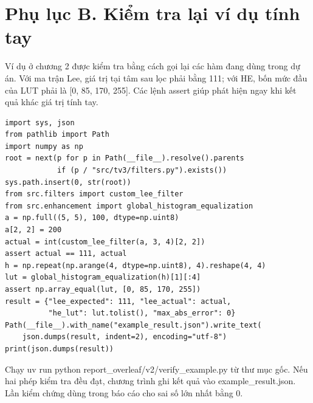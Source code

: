 \documentclass[12pt,a4paper]{extreport}
\begin{document}
\section*{Phụ lục B. Kiểm tra lại ví dụ tính tay}
Ví dụ ở chương 2 được kiểm tra bằng cách gọi lại các hàm đang dùng trong dự án. Với ma trận Lee, giá trị tại tâm sau lọc phải bằng 111; với HE, bốn mức đầu của LUT phải là [0, 85, 170, 255]. Các lệnh assert giúp phát hiện ngay khi kết quả khác giá trị tính tay.
\par
\begin{Verbatim}[fontsize=\fontsize{9}{10.3}\selectfont]
import sys, json
from pathlib import Path
import numpy as np
root = next(p for p in Path(__file__).resolve().parents
            if (p / "src/tv3/filters.py").exists())
sys.path.insert(0, str(root))
from src.filters import custom_lee_filter
from src.enhancement import global_histogram_equalization
a = np.full((5, 5), 100, dtype=np.uint8)
a[2, 2] = 200
actual = int(custom_lee_filter(a, 3, 4)[2, 2])
assert actual == 111, actual
h = np.repeat(np.arange(4, dtype=np.uint8), 4).reshape(4, 4)
lut = global_histogram_equalization(h)[1][:4]
assert np.array_equal(lut, [0, 85, 170, 255])
result = {"lee_expected": 111, "lee_actual": actual,
          "he_lut": lut.tolist(), "max_abs_error": 0}
Path(__file__).with_name("example_result.json").write_text(
    json.dumps(result, indent=2), encoding="utf-8")
print(json.dumps(result))
\end{Verbatim}
Chạy uv run python report\_overleaf/v2/verify\_example.py từ thư mục gốc. Nếu hai phép kiểm tra đều đạt, chương trình ghi kết quả vào example\_result.json. Lần kiểm chứng dùng trong báo cáo cho sai số lớn nhất bằng 0.
\par
\clearpage
\end{document}
